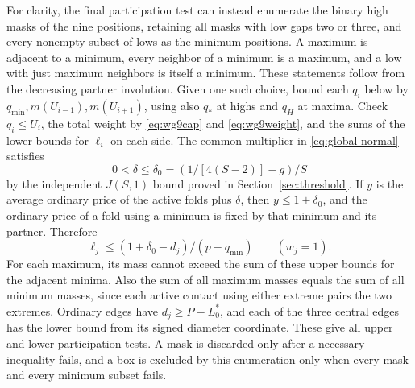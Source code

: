 \documentclass[11pt,a4paper]{article}
\theoremstyle{definition}
\begin{document}
For clarity, the final participation test can instead enumerate the
binary high masks of the nine positions, retaining all masks with
low gaps two or three, and every nonempty subset of lows as the
minimum positions. A maximum is adjacent to a minimum, every neighbor
of a minimum is a maximum, and a low with just maximum neighbors
is itself a minimum. These statements follow from the decreasing
partner involution. Given one such choice, bound each $q_i$ below
by $q_{\min}, m(U_{i-1}), m(U_{i+1})$, using also $q_*$ at highs
and $q_H$ at maxima. Check $q_i\le U_i$, the total weight by
\eqref{eq:wg9cap} and \eqref{eq:wg9weight}, and the sums of the
lower bounds for $\ell_i$ on each side. The common multiplier in
\eqref{eq:global-normal} satisfies
\[
 0<\delta\le\delta_0=(1/[4(S-2)]-g)/S
\]
by the independent $J(S,1)$ bound proved in Section~\ref{sec:threshold}.
If $y$ is the average ordinary price of the active folds plus
$\delta$, then $y\le1+\delta_0$, and the ordinary price of a fold
using a minimum is fixed by that minimum and its partner. Therefore
\[
 \ell_j\le (1+\delta_0-d_j)/(p-q_{\min})\qquad(w_j=1).
\]
For each maximum, its mass cannot exceed the sum of these upper
bounds for the adjacent minima. Also the sum of all maximum masses
equals the sum of all minimum masses, since each active contact
using either extreme pairs the two extremes. Ordinary edges have
$d_j\ge P-L_0^*$, and each of the three central edges has the lower
bound from its signed diameter coordinate. These give all upper and
lower participation tests. A mask is discarded only after a necessary
inequality fails, and a box is excluded by this enumeration only
when every mask and every minimum subset fails.
\end{document}
